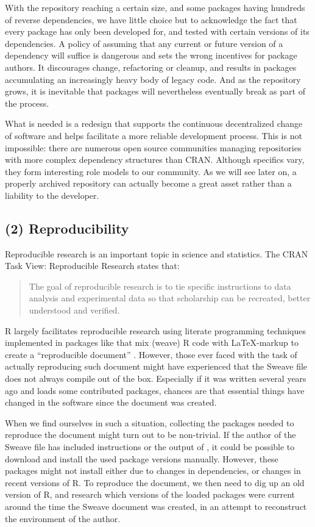 With the repository reaching a certain size, and some packages having hundreds
of reverse dependencies, we have little choice but to acknowledge the fact that
every package has only been developed for, and tested with certain versions of
its dependencies. A policy of assuming that any current or future version of a
dependency will suffice is dangerous and sets the wrong incentives for package
authors. It discourages change, refactoring or cleanup, and results in packages
accumulating an increasingly heavy body of legacy code. And as the repository
grows, it is inevitable that packages will nevertheless eventually break as part
of the process.

What is needed is a redesign that supports the continuous decentralized change
of software and helps facilitate a more reliable development process. This is not
impossible: there are numerous open source communities managing repositories with
more complex dependency structures than CRAN. Although specifics vary, they form
interesting role models to our community. As we will see later on, a properly
archived repository can actually become a great asset rather than a liability to
the developer.

\subsection{(2) Reproducibility}

Reproducible research is an important topic in science and statistics. The CRAN Task
View: Reproducible Research states that:

\begin{quote}
The goal of reproducible research is to tie specific instructions
to data analysis and experimental data so that scholarship can be recreated,
better understood and verified.
\end{quote}
R largely facilitates reproducible research using literate programming
techniques implemented in packages like  that mix (weave) R code
with \LaTeX-markup to create a ``reproducible document'' \citep{leisch2002sweave}. However, those
ever faced with the task of actually reproducing such document might
have experienced that the Sweave file does not always compile out of the box.
Especially if it was written several years ago and loads some contributed packages,
chances are that essential things have changed in the software since the
document was created.

When we find ourselves in such a situation, collecting the packages needed to reproduce
the document might turn out to be non-trivial. If the author of the Sweave file
has included instructions or the output of , it could be
possible to download and install the used package versions manually. However, these packages
might not install either due to changes in dependencies, or changes in recent versions
of R. To reproduce the document, we then need to dig up an old version of R,
and research which versions of the loaded packages were current around the time
the Sweave document was created, in an attempt to reconstruct the environment of the author.

